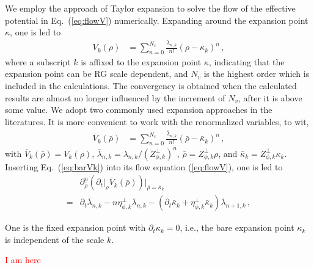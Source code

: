 \documentclass[%
reprint,
superscriptaddress,
showpacs,preprintnumbers,
 amsmath,amssymb,
 aps,
prd,
]{revtex4-1}
\def\Eq#1{Eq.~(\ref{#1})}
\newcommand{\colwjf}[1]{\textcolor{red}{#1}}
\begin{document}
We employ the approach of Taylor expansion to solve the flow of the effective potential in \Eq{eq:flowV} numerically. Expanding around the expansion point $\kappa$, one is led to 
\begin{align}\label{}
  V_k(\rho)&=\sum^{N_v}_{n=0}\frac{\lambda_{n,k}}{n!}(\rho-\kappa_k)^n\,,\label{}
\end{align}
where a subscript $k$ is affixed to the expansion point $\kappa$, indicating that the expansion point can be RG scale dependent, and $N_v$ is the highest order which is included in the calculations. The convergency is obtained when the calculated results are almost no longer influenced by the increment of $N_v$, after it is above some value. We adopt two commonly used expansion approaches in the literatures. It is more convenient to work with the renormalized variables, to wit,
\begin{align}\label{}
  \bar V_k(\bar \rho)&=\sum^{N_v}_{n=0}\frac{\bar \lambda_{n,k}}{n!}(\bar \rho-\bar \kappa_k)^n\,,\label{eq:barVk}
\end{align}
with $\bar V_k(\bar \rho)=V_k(\rho)$, $\bar \lambda_{n,k}=\lambda_{n,k}/(Z^{\perp}_{\phi,k})^n$, $\bar \rho=Z^{\perp}_{\phi,k} \rho$, and $\bar \kappa_k=Z^{\perp}_{\phi,k}\kappa_k$. Inserting \Eq{eq:barVk} into its flow equation (\ref{eq:flowV}), one is led to
\begin{align}\label{}
  &\partial^n_{\bar \rho}\left(\partial_t\big|_{\rho} \bar V_k(\bar \rho)\right)\Big|_{\bar \rho=\bar \kappa_k}\nonumber\\[2ex]
=&\partial_t \bar \lambda_{n,k}-n\eta_{\phi,k}^{\perp}\bar{\lambda}_{n,k}-(\partial_t \bar \kappa_k+\eta_{\phi,k}^{\perp}\bar \kappa_k)\bar \lambda_{n+1,k}\,,\label{}
\end{align}








 One is the fixed expansion point with $\partial_t \kappa_k=0$, i.e., the bare expansion point $\kappa_k$ is independent of the scale $k$.










\colwjf{I am here}
\end{document}
